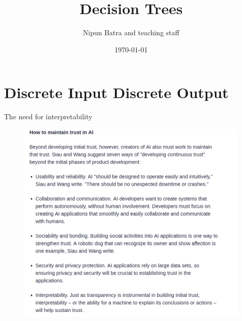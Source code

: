 \documentclass[usenames,dvipsnames]{beamer}
\title{Decision Trees}
\date{\today}
\author{Nipun Batra and teaching staff}
\institute{IIT Gandhinagar}
\begin{document}
	\maketitle
	
	
	\section{Discrete Input Discrete Output}
	\begin{frame}{The need for interpretability}
	\begin{figure}
		\centering
		\includegraphics[width=1\linewidth]{../diagrams/decision-trees/interpretability}
		\label{fig:interpretability}
	\end{figure}
	
\end{frame}
	
\end{document}

